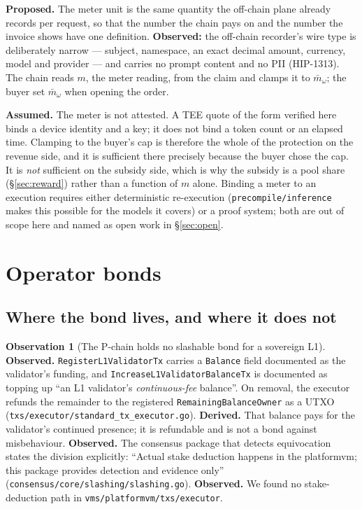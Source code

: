 \documentclass[11pt,a4paper]{article}
\theoremstyle{definition}
\newtheorem{observation}{Observation}[section]
\theoremstyle{remark}
\newcommand{\code}[1]{\texttt{#1}}
\newcommand{\Ord}{\omega}
\begin{document}
\textbf{Proposed.} The meter unit is the same quantity the off-chain plane
already records per request, so that the number the chain pays on and the number
the invoice shows have one definition. \textbf{Observed:} the off-chain
recorder's wire type is deliberately narrow --- subject, namespace, an exact
decimal amount, currency, model and provider --- and carries no prompt content
and no PII (HIP-1313). The chain reads $m$, the meter reading, from the claim
and clamps it to $\bar m_\Ord$; the buyer set $\bar m_\Ord$ when opening the
order.

\textbf{Assumed.} The meter is not attested. A TEE quote of the form verified
here binds a device identity and a key; it does not bind a token count or an
elapsed time. Clamping to the buyer's cap is therefore the whole of the
protection on the revenue side, and it is sufficient there precisely because
the buyer chose the cap. It is \emph{not} sufficient on the subsidy side, which
is why the subsidy is a pool share (\S\ref{sec:reward}) rather than a function
of $m$ alone. Binding a meter to an execution requires either deterministic
re-execution (\code{precompile/inference} makes this possible for the models it
covers) or a proof system; both are out of scope here and named as open work in
\S\ref{sec:open}.

\section{Operator bonds}
\label{sec:bond}

\subsection{Where the bond lives, and where it does not}

\begin{observation}[The P-chain holds no slashable bond for a sovereign L1]
\textbf{Observed.} \code{RegisterL1ValidatorTx} carries a \code{Balance} field
documented as the validator's funding, and \code{IncreaseL1ValidatorBalanceTx}
is documented as topping up ``an L1 validator's \emph{continuous-fee}
balance''. On removal, the executor refunds the remainder to the registered
\code{RemainingBalanceOwner} as a UTXO
(\code{txs/executor/standard\_tx\_executor.go}). \textbf{Derived.} That balance
pays for the validator's continued presence; it is refundable and is not a bond
against misbehaviour. \textbf{Observed.} The consensus package that detects
equivocation states the division explicitly: ``Actual stake deduction happens in
the platformvm; this package provides detection and evidence only''
(\code{consensus/core/slashing/slashing.go}). \textbf{Observed.} We found no
stake-deduction path in \code{vms/platformvm/txs/executor}.
\end{observation}
\end{document}
